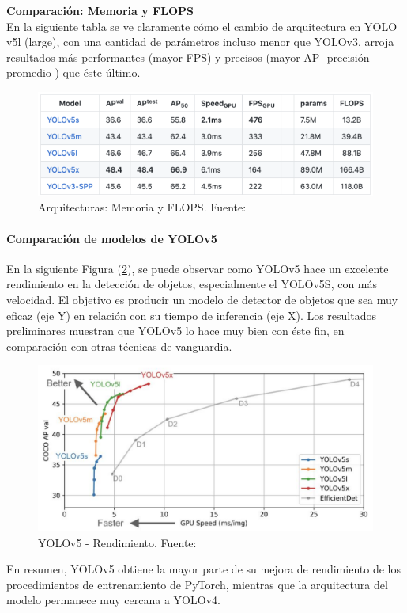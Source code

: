 \textbf{Comparación: Memoria y FLOPS} \\

En la siguiente tabla se ve claramente cómo el cambio de arquitectura en YOLO v5l (large), con una cantidad de parámetros incluso menor que YOLOv3, arroja resultados más performantes (mayor FPS) y precisos (mayor AP -precisión promedio-) que éste último.

\begin{figure}[h!]
    \centering
    \includegraphics[width=1\textwidth]{img/tablaFLOPS.png}
    \caption{Arquitecturas: Memoria y FLOPS. Fuente: \cite{yolov5}}
    \label{fig:tabla flops}
\end{figure}

\paragraph{Comparación de modelos de YOLOv5}
En la siguiente Figura (\ref{fig:yolo-v5-comparacion}), se puede observar como YOLOv5 hace un excelente rendimiento en la detección de objetos, especialmente el YOLOv5S, con más velocidad.
El objetivo es producir un modelo de detector de objetos que sea muy eficaz (eje Y) en relación con su tiempo de inferencia (eje X). Los resultados preliminares muestran que YOLOv5 lo hace muy bien con éste fin, en comparación con otras técnicas de vanguardia.

\begin{figure}[h!]
    \centering
    \includegraphics[width=1\textwidth]{img/Yolov5.png}
    \caption{YOLOv5 - Rendimiento. Fuente: \cite{yolov5}}
    \label{fig:yolo-v5-comparacion}
\end{figure}

En resumen, YOLOv5 obtiene la mayor parte de su mejora de rendimiento de los procedimientos de entrenamiento de PyTorch, mientras que la arquitectura del modelo permanece muy cercana a YOLOv4.

\newpage